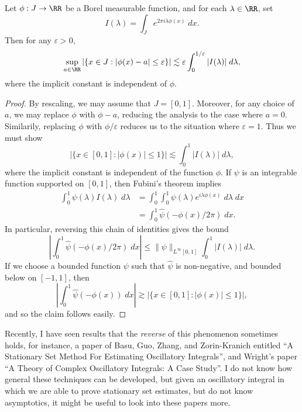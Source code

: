 \begin{theorem}
  Let $\phi: J \to \RR$ be a Borel measurable function, and for each $\lambda \in \RR$, set
  \[ I(\lambda) = \int_J e^{2 \pi i \lambda \phi(x)}\; dx. \]
  Then for any $\varepsilon > 0$,
  \[ \sup_{a \in \RR} |\{ x \in J: |\phi(x) - a| \leq \varepsilon \}| \lesssim \varepsilon \int_0^{1/\varepsilon} |I(\lambda)|\; d\lambda, \]
  where the implicit constant is independent of $\phi$.
\end{theorem}
\begin{proof}
  By rescaling, we may assume that $J = [0,1]$. Moreover, for any choice of $a$, we may replace $\phi$ with $\phi - a$, reducing the analysis to the case where $a = 0$. Similarily, replacing $\phi$ with $\phi/\varepsilon$ reduces us to the situation where $\varepsilon = 1$. Thus we must show
  \[ |\{ x \in [0,1]: |\phi(x)| \leq 1 \}| \lesssim \int_0^1 |I(\lambda)|\; d\lambda, \]
  where the implicit constant is independent of the function $\phi$. If $\psi$ is an integrable function supported on $[0,1]$, then Fubini's theorem implies
  \begin{align*}
    \int_0^1 \psi(\lambda) I(\lambda)\; d\lambda &= \int_0^1 \int_0^1 \psi(\lambda) e^{i \lambda \phi(x)}\; d\lambda\; dx\\
    &= \int_0^1 \widehat{\psi}(- \phi(x) / 2 \pi)\; dx.
  \end{align*}
  In particular, reversing this chain of identities gives the bound
  \[ \left| \int_0^1 \widehat{\psi}(- \phi(x) / 2\pi)\; dx \right| \leq \| \psi \|_{L^\infty[0,1]} \int_0^1 |I(\lambda)|\; d\lambda. \]
  If we choose a bounded function $\psi$ such that $\widehat{\psi}$ is non-negative, and bounded below on $[-1,1]$, then
  \[ \left| \int_0^1 \widehat{\psi}(- \phi(x))\; dx \right| \gtrsim |\{ x \in [0,1]: |\phi(x)| \leq 1 \}|, \]
  and so the claim follows easily.
\end{proof}

\begin{remark}
    Recently, I have seen results that the \emph{reverse} of this phenomenon sometimes holds, for instance, a paper of Basu, Guo, Zhang, and Zorin-Kranich entitled ``A Stationary Set Method For Estimating Oscillatory Integrals'', and Wright's paper ``A Theory of Complex Oscillatory Integrals: A Case Study''. I do not know how general these techniques can be developed, but given an oscillatory integral in which we are able to prove stationary set estimates, but do not know asymptotics, it might be useful to look into these papers more.
\end{remark}

